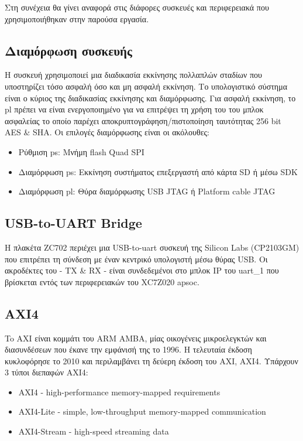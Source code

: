 \newpage Στη συνέχεια θα γίνει αναφορά στις διάφορες συσκευές και περιφερειακά που χρησιμοποιήθηκαν στην παρούσα εργασία.

\subsection{Διαμόρφωση συσκευής}

Η συσκευή χρησιμοποιεί μια διαδικασία εκκίνησης πολλαπλών σταδίων που υποστηρίζει τόσο ασφαλή όσο και μη ασφαλή εκκίνηση. Το υπολογιστικό σύστημα είναι ο κύριος της διαδικασίας εκκίνησης και διαμόρφωσης. Για ασφαλή εκκίνηση, το \gls{pl} πρέπει να είναι ενεργοποιημένο για να επιτρέψει τη χρήση του του μπλοκ ασφαλείας το οποίο παρέχει αποκρυπτογράφηση/πιστοποίηση ταυτότητας 256 bit AES \& SHA. Οι επιλογές διαμόρφωσης είναι οι ακόλουθες:
\begin{itemize}
	\item Ρύθμιση \gls{ps}: Μνήμη flash Quad SPI
	\item Διαμόρφωση \gls{ps}: Εκκίνηση συστήματος επεξεργαστή από κάρτα SD ή μέσω SDK
	\item Διαμόρφωση \gls{pl}: Θύρα διαμόρφωσης USB JTAG ή Platform cable JTAG
\end{itemize}
\subsection{USB-to-UART Bridge}

Η πλακέτα ZC702 περιέχει μια USB-to-\gls{uart} συσκευή της Silicon Labs (CP2103GM) που επιτρέπει τη σύνδεση με έναν κεντρικό υπολογιστή μέσω θύρας USB. Οι ακροδέκτες του - TX \& RX - είναι συνδεδεμένοι στο μπλοκ IP του \gls{uart}\_1 που βρίσκεται εντός των περιφερειακών του XC7Z020 \gls{apsoc}.
\subsection{AXI4}

To ΑΧΙ είναι κομμάτι του ARM AMBA, μίας οικογένεις μικροελεγκτών και διασυνδέσεων που έκανε την εμφάνισή της το 1996. Η τελευταία έκδοση κυκλοφόρησε το 2010 και περιλαμβάνει τη δεύερη έκδοση του AXI, AXI4. Υπάρχουν 3 τύποι διεπαφών AXI4:
\begin{itemize}[leftmargin=*]
	\item{AXI4 - high-performance memory-mapped requirements}
	\item{AXI4-Lite - simple, low-throughput memory-mapped communication}
	\item{AXI4-Stream - high-speed streaming data}
\end{itemize}

